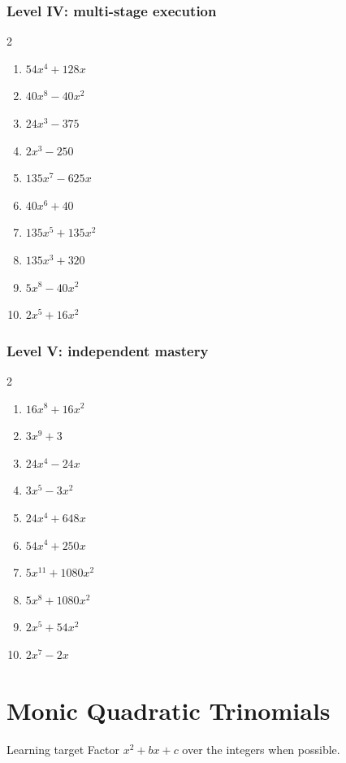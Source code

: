 \documentclass[11pt,oneside]{book}
\begin{document}
\subsection*{Level IV: multi-stage execution}
\begin{multicols}{2}
\begin{enumerate}[leftmargin=*,label=\textbf{\arabic*.},itemsep=0.65\baselineskip]
\item $ 54 x^{4} + 128 x $
\item $ 40 x^{8} - 40 x^{2} $
\item $ 24 x^{3} - 375 $
\item $ 2 x^{3} - 250 $
\item $ 135 x^{7} - 625 x $
\item $ 40 x^{6} + 40 $
\item $ 135 x^{5} + 135 x^{2} $
\item $ 135 x^{3} + 320 $
\item $ 5 x^{8} - 40 x^{2} $
\item $ 2 x^{5} + 16 x^{2} $
\end{enumerate}
\end{multicols}
\subsection*{Level V: independent mastery}
\begin{multicols}{2}
\begin{enumerate}[leftmargin=*,label=\textbf{\arabic*.},itemsep=0.65\baselineskip]
\item $ 16 x^{8} + 16 x^{2} $
\item $ 3 x^{9} + 3 $
\item $ 24 x^{4} - 24 x $
\item $ 3 x^{5} - 3 x^{2} $
\item $ 24 x^{4} + 648 x $
\item $ 54 x^{4} + 250 x $
\item $ 5 x^{11} + 1080 x^{2} $
\item $ 5 x^{8} + 1080 x^{2} $
\item $ 2 x^{5} + 54 x^{2} $
\item $ 2 x^{7} - 2 x $
\end{enumerate}
\end{multicols}
\chapter{Monic Quadratic Trinomials}
\begin{rulebox}{Learning target}
Factor $x^2+bx+c$ over the integers when possible.
\end{rulebox}
\end{document}
